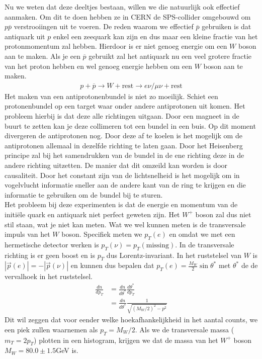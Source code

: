 \documentclass[../main.tex]{subfiles}
\begin{document}
Nu we weten dat deze deeltjes bestaan, willen we die natuurlijk ook effectief aanmaken. Om dit te doen hebben ze in CERN de SPS-collider omgebouwd om $p\overline p$ verstrooiingen uit te voeren. De reden waarom we effectief $\overline p$ gebruiken is dat antiquark uit $p$ enkel een zeequark kan zijn en dus maar een kleine fractie van het protonmomentum zal hebben. Hierdoor is er niet genoeg energie om een $W$ boson aan te maken. Als je een $\overline p$ gebruikt zal het antiquark nu een veel grotere fractie van het proton hebben en wel genoeg energie hebben om een $W$ boson aan te maken.
\begin{equation}
    \begin{aligned}
        \label{eq:w_productie}
        p + \overline p \rightarrow W + \text{rest} \rightarrow e\nu / \mu\nu + \text{rest}
    \end{aligned}
\end{equation}
Het maken van een antiprotonenbundel is niet zo moeilijk. Schiet een protonenbundel op een target waar onder andere antiprotonen uit komen. Het probleem hierbij is dat deze alle richtingen uitgaan. Door een magneet in de buurt te zetten kan je deze collimeren tot een bundel in een buis. Op dit moment divergeren de antiprotonen nog. Door deze af te koelen is het mogelijk om de antiprotonen allemaal in dezelfde richting te laten gaan. Door het Heisenberg principe zal bij het samendrukken van de bundel in de ene richting deze in de andere richting uitzetten. De manier dat dit omzeild kan worden is door causaliteit. Door het constant zijn van de lichtsnelheid is het mogelijk om in vogelvlucht informatie sneller aan de andere kant van de ring te krijgen en die informatie te gebruiken om de bundel bij te sturen.\\
Het probleem bij deze experimenten is dat de energie en momentum van de initiële quark en antiquark niet perfect geweten zijn. Het $W^+$ boson zal dus niet stil staan, wat je niet kan meten. Wat we wel kunnen meten is de transversale impuls van het $W$ boson. Specifiek meten we $p_T(e)$ en omdat we met een hermetische detector werken is $p_T(\nu) = p_T(\text{missing})$. In de transversale richting is er geen boost en is $p_T$ dus Lorentz-invariant. In het ruststelsel van $W$ is $|\vec{p}(e)|=-|\vec{p}(\nu)|$ en kunnen dus bepalen dat $p_T(e) = \frac{M_W}{2} \sin\theta^*$ met $\theta^*$ de de vervalhoek in het ruststelsel.
\begin{equation}
    \begin{aligned}
        \label{eq:mom_dist}
        \frac{dn}{dp_T} &= \frac{dn}{d\theta^*} \frac{d\theta^*}{dp_T} \\
                        &= \frac{dn}{d\theta^*} \frac{1}{\sqrt{(M_W/2)^2-p^2}} 
    \end{aligned}
\end{equation}
Dit wil zeggen dat voor eender welke hoekafhankelijkheid in het aantal counts, we een piek zullen waarnemen als $p_T=M_W/2$. Als we de transversale massa ($m_T=2p_T$) plotten in een histogram, krijgen we dat de massa van het $W^+$ boson $M_W=80.0\pm 1.5$GeV is.
\end{document}
